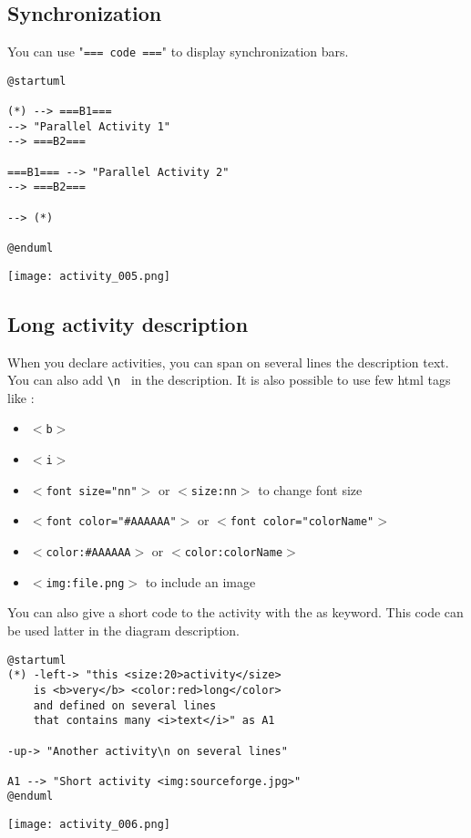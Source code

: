 \newpage \subsection{Synchronization}

You can use "\texttt{=== code ===}" to display synchronization bars.

\begin{lstlisting}
@startuml

(*) --> ===B1=== 
--> "Parallel Activity 1"
--> ===B2===

===B1=== --> "Parallel Activity 2"
--> ===B2===

--> (*)

@enduml
\end{lstlisting}
\begin{center}
\texttt{[image: activity\_005.png]}
\end{center}



\newpage \subsection{Long activity description}

When you declare activities, you can span on several lines the description text.
You can also add \texttt{\textbackslash n } in the description.
It is also possible to use few html tags like :

\begin{itemize}
\item \texttt{$<$b$>$}
\item \texttt{$<$i$>$}
\item \texttt{$<$font size="nn"$>$} or \texttt{$<$size:nn$>$} to change font
size
\item \texttt{$<$font color="\#AAAAAA"$>$} or \texttt{$<$font
color="colorName"$>$}
\item \texttt{$<$color:\#AAAAAA$>$} or \texttt{$<$color:colorName$>$}
\item \texttt{$<$img:file.png$>$} to include an image
\end{itemize}

You can also give a short code to the activity with the as keyword.
This code can be used latter in the diagram description.

\begin{lstlisting}
@startuml
(*) -left-> "this <size:20>activity</size>
	is <b>very</b> <color:red>long</color>
	and defined on several lines
	that contains many <i>text</i>" as A1

-up-> "Another activity\n on several lines"

A1 --> "Short activity <img:sourceforge.jpg>"
@enduml
\end{lstlisting}
\begin{center}
\texttt{[image: activity\_006.png]}
\end{center}



